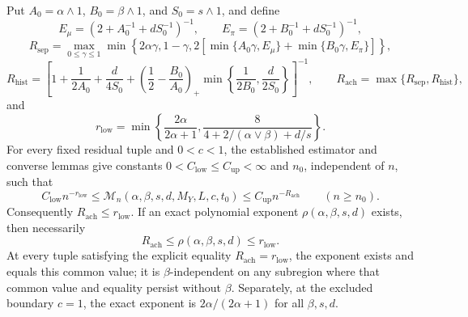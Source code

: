 Put \(A_0=\alpha\wedge1\), \(B_0=\beta\wedge1\), and \(S_0=s\wedge1\), and define
\[
E_\mu=\left(2+A_0^{-1}+dS_0^{-1}\right)^{-1},\qquad E_\pi=\left(2+B_0^{-1}+dS_0^{-1}\right)^{-1},
\]
\[
R_{\mathrm{sep}}=\max_{0\le\gamma\le1}\min\left\{2\alpha\gamma,1-\gamma,2\left[\min\{A_0\gamma,E_\mu\}+\min\{B_0\gamma,E_\pi\}\right]\right\},
\]
\[
R_{\mathrm{hist}}=\left[1+\frac1{2A_0}+\frac d{4S_0}+\left(\frac12-\frac{B_0}{A_0}\right)_+\min\left\{\frac1{2B_0},\frac d{2S_0}\right\}\right]^{-1},\qquad R_{\mathrm{ach}}=\max\{R_{\mathrm{sep}},R_{\mathrm{hist}}\},
\]
and
\[
r_{\mathrm{low}}=\min\left\{\frac{2\alpha}{2\alpha+1},\frac{8}{4+2/(\alpha\vee\beta)+d/s}\right\}.
\]
For every fixed residual tuple and \(0<c<1\), the established estimator and converse lemmas give constants \(0<C_{\mathrm{low}}\le C_{\mathrm{up}}<\infty\) and \(n_0\), independent of \(n\), such that
\[
C_{\mathrm{low}}n^{-r_{\mathrm{low}}}\le\mathcal M_n(\alpha,\beta,s,d,M_Y,L,c,t_0)\le C_{\mathrm{up}}n^{-R_{\mathrm{ach}}}\qquad(n\ge n_0).
\]
Consequently \(R_{\mathrm{ach}}\le r_{\mathrm{low}}\). If an exact polynomial exponent \(\rho(\alpha,\beta,s,d)\) exists, then necessarily
\[
R_{\mathrm{ach}}\le\rho(\alpha,\beta,s,d)\le r_{\mathrm{low}}.
\]
At every tuple satisfying the explicit equality \(R_{\mathrm{ach}}=r_{\mathrm{low}}\), the exponent exists and equals this common value; it is \(\beta\)-independent on any subregion where that common value and equality persist without \(\beta\). Separately, at the excluded boundary \(c=1\), the exact exponent is \(2\alpha/(2\alpha+1)\) for all \(\beta,s,d\).